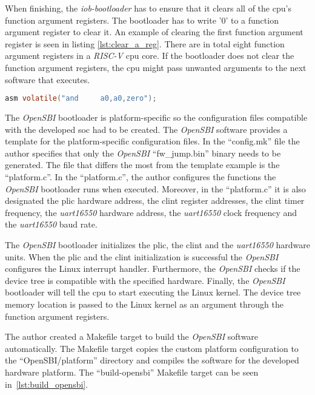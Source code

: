 When finishing, the \textit{iob-bootloader} has to ensure that it clears all of the \acrshort{cpu}’s function argument registers. The bootloader has to write '0' to a function argument register to clear it. An example of clearing the first function argument register is seen in listing \ref{lst:clear_a_reg}. There are in total eight function argument registers in a \textit{RISC-V} \acrshort{cpu} core. If the bootloader does not clear the function argument registers, the \acrshort{cpu} might pass unwanted arguments to the next software that executes.

\begin{lstlisting}[language=c, caption={Clear a function argument register.}, label=lst:clear_a_reg]
    asm volatile("and     a0,a0,zero");
\end{lstlisting}

The \textit{OpenSBI} bootloader is platform-specific so the configuration files compatible with the developed \acrshort{soc} had to be created. The \textit{OpenSBI} software provides a template for the platform-specific configuration files. In the \enquote{config.mk} file the author specifies that only the \textit{OpenSBI} \enquote{fw\_jump.bin} binary needs to be generated. The file that differs the most from the template example is the \enquote{platform.c}. In the \enquote{platform.c}, the author configures the functions the \textit{OpenSBI} bootloader runs when executed. Moreover, in the \enquote{platform.c} it is also designated the \acrshort{plic} hardware address, the \acrshort{clint} register addresses, the \acrshort{clint} timer frequency, the \textit{\acrshort{uart}16550} hardware address, the \textit{\acrshort{uart}16550} clock frequency and the \textit{\acrshort{uart}16550} baud rate.

The \textit{OpenSBI} bootloader initializes the \acrshort{plic}, the \acrshort{clint} and the \textit{\acrshort{uart}16550} hardware units. When the \acrshort{plic} and the \acrshort{clint} initialization is successful the \textit{OpenSBI} configures the Linux interrupt handler. Furthermore, the \textit{OpenSBI} checks if the device tree is compatible with the specified hardware. Finally, the \textit{OpenSBI} bootloader will tell the \acrshort{cpu} to start executing the Linux kernel. The device tree memory location is passed to the Linux kernel as an argument through the function argument registers.

The author created a Makefile target to build the \textit{OpenSBI} software automatically. The Makefile target copies the custom platform configuration to the \enquote{OpenSBI/platform} directory and compiles the software for the developed hardware platform. The \enquote{build-opensbi} Makefile target can be seen in~\ref{lst:build_opensbi}.

